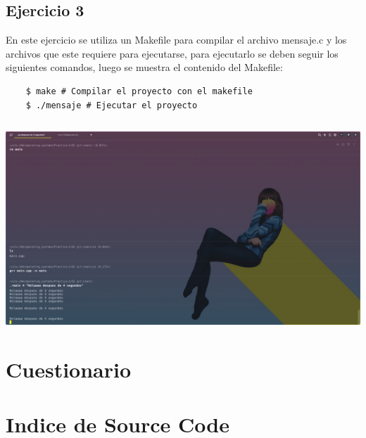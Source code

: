 \documentclass[]{article}
\newenvironment{code}{\captionsetup{type=listing}}{}
\begin{document}
\subsection{Ejercicio 3}
En este ejercicio se utiliza un Makefile para compilar el archivo mensaje.c
y los archivos que este requiere para ejecutarse, para ejecutarlo se deben 
seguir los siguientes comandos, luego se muestra el contenido del Makefile:
\begin{verbatim}
	$ make # Compilar el proyecto con el makefile
	$ ./mensaje # Ejecutar el proyecto
\end{verbatim}

\begin{code}
	\label{code:c-code}
	\inputminted{Makefile}{../E3/Makefile}
\end{code}
		
\includegraphics[scale=0.3,trim={0 0 20cm 20cm},clip]{e2-out.png}  


\section{Cuestionario}


\section{Indice de Source Code}
\renewcommand{\listlistingname}{Source Code}
\listoflistings

		
	
\end{document}
